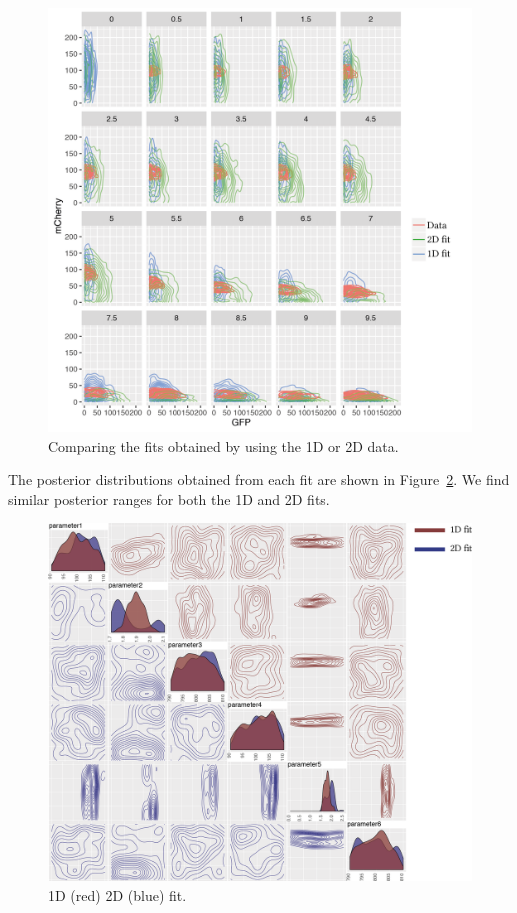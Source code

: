 \begin{figure}[htbp]
\centering
\includegraphics[scale=0.8]{chapterABCFlow/images/compare_1D_2d.png}
\caption[LoF caption]{\label{fig:1d2dcomp} Comparing the fits obtained by using the 1D or 2D data. }
\end{figure}
\clearpage


The posterior distributions obtained from each fit are shown in Figure~\ref{fig:1d2d-sim-post}. We find similar posterior ranges for both the 1D and 2D fits.

\begin{figure}[htbp]
\centering
	\includegraphics[scale=0.8]{chapterABCFlow/images/sim_1d_2d_post.png}
	\caption[LoF caption]{\label{fig:1d2d-sim-post} 1D (red) 2D (blue) fit. }
\end{figure}

